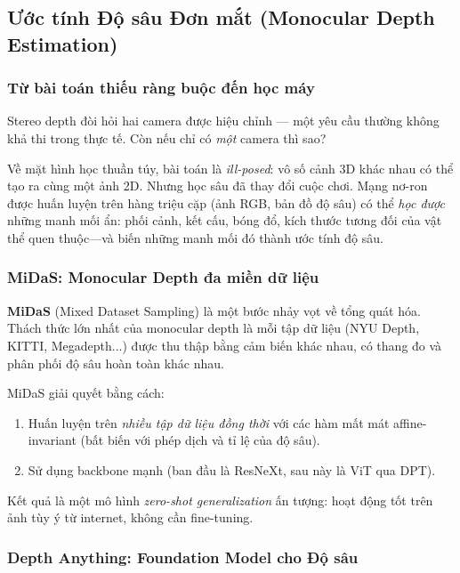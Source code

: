 \subsection{Ước tính Độ sâu Đơn mắt (Monocular Depth Estimation)}
\label{subsec:monocular_depth}

\subsubsection{Từ bài toán thiếu ràng buộc đến học máy}
\label{subsubsec:monocular_motivation}

Stereo depth đòi hỏi hai camera được hiệu chỉnh — một yêu cầu thường không khả thi trong thực tế. Còn nếu chỉ có \textit{một} camera thì sao?

Về mặt hình học thuần túy, bài toán là \textit{ill-posed}: vô số cảnh 3D khác nhau có thể tạo ra cùng một ảnh 2D. Nhưng học sâu đã thay đổi cuộc chơi. Mạng nơ-ron được huấn luyện trên hàng triệu cặp (ảnh RGB, bản đồ độ sâu) có thể \textit{học được} những manh mối ẩn: phối cảnh, kết cấu, bóng đổ, kích thước tương đối của vật thể quen thuộc—và biến những manh mối đó thành ước tính độ sâu.

\subsubsection{MiDaS: Monocular Depth đa miền dữ liệu}
\label{subsubsec:midas}

\textbf{MiDaS} \cite{Ranftl2020} (Mixed Dataset Sampling) là một bước nhảy vọt về tổng quát hóa. Thách thức lớn nhất của monocular depth là mỗi tập dữ liệu (NYU Depth, KITTI, Megadepth...) được thu thập bằng cảm biến khác nhau, có thang đo và phân phối độ sâu hoàn toàn khác nhau.

MiDaS giải quyết bằng cách:
\begin{enumerate}
    \item Huấn luyện trên \textit{nhiều tập dữ liệu đồng thời} với các hàm mất mát affine-invariant (bất biến với phép dịch và tỉ lệ của độ sâu).
    \item Sử dụng backbone mạnh (ban đầu là ResNeXt, sau này là ViT qua DPT).
\end{enumerate}

Kết quả là một mô hình \textit{zero-shot generalization} ấn tượng: hoạt động tốt trên ảnh tùy ý từ internet, không cần fine-tuning.

\subsubsection{Depth Anything: Foundation Model cho Độ sâu}
\label{subsubsec:depth_anything}

